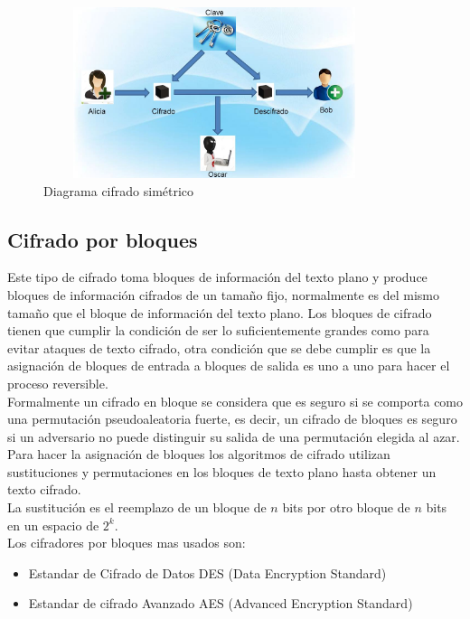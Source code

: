 \documentclass[12pt,oneside,onecolumn,openany]{report}
\begin{document}
\begin{figure}[H]
\centering
	\includegraphics[width=10cm, height=5cm]{./images/simetrico.jpg}
	\caption{Diagrama cifrado simétrico}
	\label{fig:1-2-1}
\end{figure}

\subsection{Cifrado por bloques}
Este tipo de cifrado toma bloques de información del texto plano y produce bloques de información cifrados de un tamaño fijo, normalmente es del mismo tamaño que el bloque de información del texto plano. Los bloques de cifrado tienen que cumplir la condición de ser lo suficientemente grandes como para evitar ataques de texto cifrado, otra condición que se debe cumplir es que la asignación de bloques de entrada a bloques de salida es uno a uno para hacer el proceso reversible.\\
Formalmente un cifrado en bloque se considera que es seguro si se comporta como una permutación pseudoaleatoria fuerte, es decir, un cifrado de bloques es seguro si un adversario no puede distinguir su salida de una permutación elegida al azar.\\
Para hacer la asignación de bloques los algoritmos de cifrado utilizan sustituciones y permutaciones en los bloques de texto plano hasta obtener un texto cifrado.\\
La sustitución es el reemplazo de un bloque de $n$ bits por otro bloque de $n$ bits en un espacio de \(2^{k}\).\cite{bloc}\\
Los cifradores por bloques mas usados son:
\begin{itemize}
 \item Estandar de Cifrado de Datos DES (Data Encryption Standard)
 \item Estandar de cifrado Avanzado AES (Advanced Encryption Standard)
\end{itemize}
\end{document}
